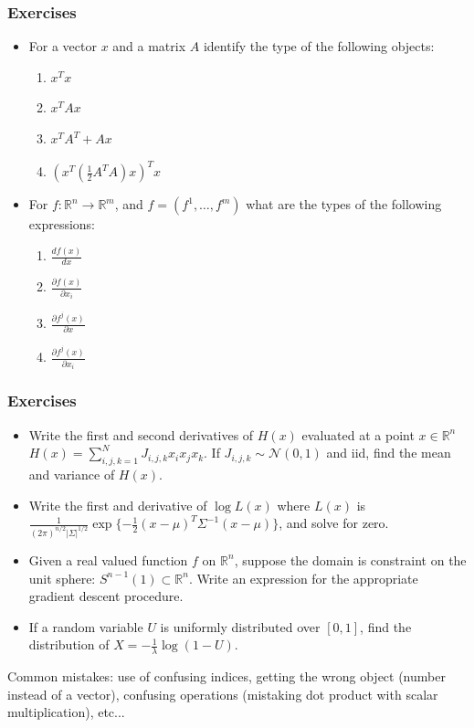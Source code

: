\documentclass{beamer}
\begin{document}
\begin{frame}
\frametitle{Exercises}
\begin{itemize}
    \item For a vector $x$ and a matrix $A$ identify the type of the following objects:
    \begin{enumerate}
        \item $x^Tx$
        \item $x^TAx$
        \item $x^TA^T + Ax$
        \item $(x^T(\frac{1}{2}A^TA)x)^Tx$
    \end{enumerate}
    \item For $f: \mathbb{R}^n \rightarrow \mathbb{R}^m$, and $f=(f^1,\dots,f^m)$ what are the types of the following expressions:
    \begin{enumerate}
        \item $\frac{df(x)}{dx}$
        \item $\frac{\partial f(x)}{\partial x_i}$
        \item $\frac{\partial f^j(x)}{\partial x}$
        \item $\frac{\partial f^j(x)}{\partial x_i}$
    \end{enumerate}
\end{itemize}

\end{frame}


\begin{frame}
\frametitle{Exercises}
\begin{itemize}
    \item Write the first and second derivatives of $H(x)$ evaluated at a point $x\in \mathbb{R}^n$ $H(x)=\sum_{i,j,k=1}^N J_{i,j,k}x_i x_j x_k$. If $J_{i,j,k} \sim \mathcal{N}(0,1)$ and iid, find the mean and variance of $H(x)$.
    \item Write the first and derivative of $\log L(x)$ where $L(x)$ is $\frac{1}{(2\pi)^{n/2}|\Sigma|^{1/2}}\exp{\{-\frac{1}{2}(x-\mu)^T\Sigma^{-1}(x-\mu)\}}$, and solve for zero.
    \item Given a real valued function $f$ on $\mathbb{R}^n$, suppose the domain is constraint on the unit sphere: $S^{n-1}(1) \subset \mathbb{R}^n$. Write an expression for the appropriate gradient descent procedure.%
    \item If a random variable $U$ is uniformly distributed over $[0,1]$, find the distribution of $X=-\frac{1}{\lambda}\log(1-U)$.
\end{itemize}

Common mistakes: use of confusing indices, getting the wrong object (number instead of a vector), confusing operations (mistaking dot product with scalar multiplication), etc...

\end{frame}
\end{document}

